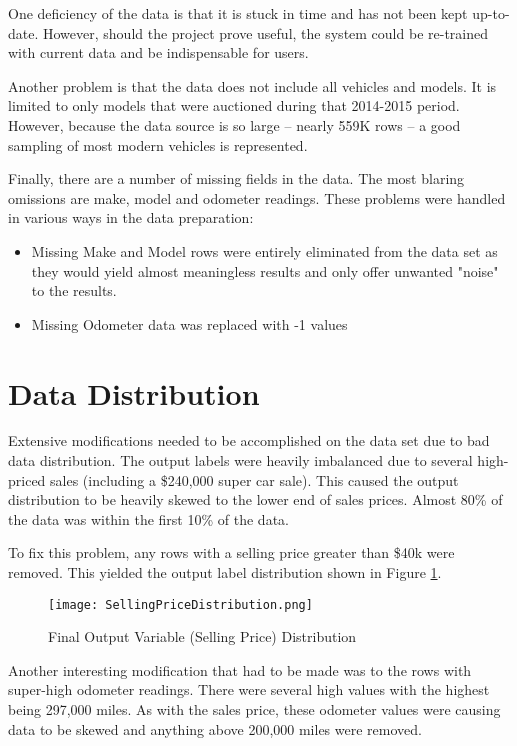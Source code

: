 \documentclass[a4paper,12pt]{article}
\begin{document}
One deficiency of the data is that it is stuck in time and has not been kept up-to-date.  However, should the project prove useful, the system could be re-trained with current data and be indispensable for users.

Another problem is that the data does not include all vehicles and models.  It is limited to only models that were auctioned during that 2014-2015 period.  However, because the data source is so large -- nearly 559K rows -- a good sampling of most modern vehicles is represented.

Finally, there are a number of missing fields in the data.  The most blaring omissions are make, model and odometer readings.  These problems were handled in various ways in the data preparation:

\begin{itemize}
\item Missing Make and Model rows were entirely eliminated from the data set as they would yield almost meaningless results and only offer unwanted "noise" to the results.

\item Missing Odometer data was replaced with -1 values
\end{itemize}

\section{Data Distribution}

Extensive modifications needed to be accomplished on the data set due to bad data distribution.  The output labels were heavily imbalanced due to several high-priced sales (including a \$240,000 super car sale).  This caused the output distribution to be heavily skewed to the lower end of sales prices.  Almost 80\% of the data was within the first 10\% of the data.

To fix this problem, any rows with a selling price greater than \$40k were removed.  This yielded the output label distribution shown in Figure {\ref{fig:SalesDist}}.

\begin{figure}
\centerline{\texttt{[image: SellingPriceDistribution.png]}}
\caption{Final Output Variable (Selling Price) Distribution}
\label{fig:SalesDist}
\end{figure}

Another interesting modification that had to be made was to the rows with super-high odometer readings.  There were several high values with the highest being 297,000 miles.  As with the sales price, these odometer values were causing data to be skewed and anything above 200,000 miles were removed.
\end{document}
